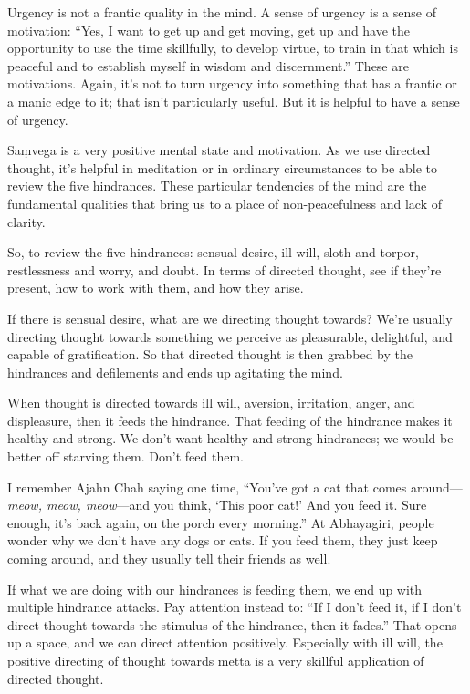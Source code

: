 Urgency is not a frantic quality in the mind. A sense of urgency is a
sense of motivation: “Yes, I want to get up and get moving, get up and
have the opportunity to use the time skillfully, to develop virtue, to
train in that which is peaceful and to establish myself in wisdom and
discernment.” These are motivations. Again, it’s not to turn urgency
into something that has a frantic or a manic edge to it; that isn’t
particularly useful. But it is helpful to have a sense of urgency.

Saṃvega is a very positive mental state and motivation. As we use
directed thought, it’s helpful in meditation or in ordinary
circumstances to be able to review the five hindrances. These particular
tendencies of the mind are the fundamental qualities that bring us to a
place of non-peacefulness and lack of clarity.

So, to review the five hindrances: sensual desire, ill will, sloth and
torpor, restlessness and worry, and doubt. In terms of directed thought,
see if they’re present, how to work with them, and how they arise.

If there is sensual desire, what are we directing thought towards? We’re
usually directing thought towards something we perceive as pleasurable,
delightful, and capable of gratification. So that directed thought is
then grabbed by the hindrances and defilements and ends up agitating the
mind.

When thought is directed towards ill will, aversion, irritation, anger,
and displeasure, then it feeds the hindrance. That feeding of the
hindrance makes it healthy and strong. We don’t want healthy and strong
hindrances; we would be better off starving them. Don’t feed them.

I remember Ajahn Chah saying one time, “You’ve got a cat that comes
around—\emph{meow, meow, meow}—and you think, ‘This poor cat!’ And you
feed it. Sure enough, it’s back again, on the porch every morning.” At
Abhayagiri, people wonder why we don’t have any dogs or cats. If you
feed them, they just keep coming around, and they usually tell their
friends as well.

If what we are doing with our hindrances is feeding them, we end up with
multiple hindrance attacks. Pay attention instead to: “If I don’t feed
it, if I don’t direct thought towards the stimulus of the hindrance,
then it fades.” That opens up a space, and we can direct attention
positively. Especially with ill will, the positive directing of thought
towards mettā is a very skillful application of directed thought.

